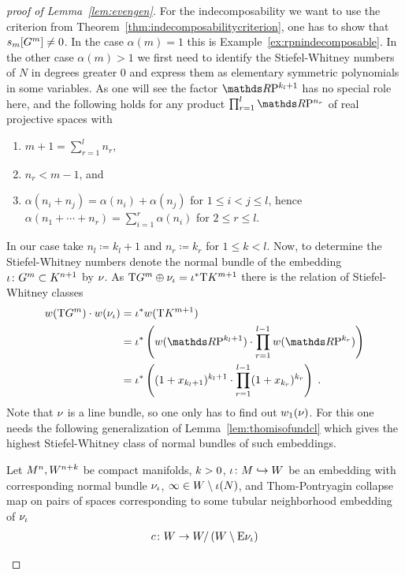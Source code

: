 \begin{proof}[proof of
  Lemma~\ref{lem:evengen}]
  For the indecomposability we want to use the criterion from
  Theorem~\ref{thm:indecomposabilitycriterion}, \idest one has to show
  that $s_{m}[G^{m}]\neq 0$.
  In the case $\alpha(m)=1$ this is Example~\ref{ex:rpnindecomposable}.
  In the other case $\alpha(m)>1$ we first need to identify the
  Stiefel-Whitney numbers of $N$ in degrees greater 0 and express them
  as elementary symmetric polynomials in some variables.
  As one will see the factor $\RP{k_l+1}$ has no special role here,
  and the following holds for any product $\prod_{r=1}^{l}\RP{n_r}$ of
  real projective spaces with
  \begin{enumerate}
  \item $m+1=\sum_{r=1}^l n_r$,
  \item $n_r<m-1$, and
  \item $\alpha(n_i+n_j)=\alpha(n_i)+\alpha(n_j)$
    for $1\leq i<j\leq l$,
    hence $\alpha(n_1+\dotsb+n_r)=\sum_{i=1}^{r}\alpha(n_i)$
    for $2\leq r\leq l$.
  \end{enumerate}
  In our case take $n_l\coloneqq k_l+1$ and 
  $n_r\coloneqq k_r$ for $1\leq k<l$.
  Now, to determine the Stiefel-Whitney numbers 
  denote the normal bundle of the embedding
  ${\iota}\colon G^{m}\subset K^{n+1}$ by $\nu_{}$. 
  As $\mathrm{T}G^{m}\oplus\nu_{{\iota}}={{\iota}}^*\mathrm{T}K^{m+1}$ there is the relation
  of Stiefel-Whitney classes
  \begin{align*}
    \W{\T{\G m}} \cdot \W{\N\emb}
    &= \pb\emb\W{\T{K^{m+1}}} \\
    &= \pb\emb\left(
      \W{\RP{k_l+1}}
      \cdot \prod_{r=1}^{l-1}\W{\RP{k_r}}
      \right) \\
    &= \pb\emb\left(
      (1+x_{k_l+1})^{k_l+1}
      \cdot \prod_{r=1}^{l-1}(1+x_{k_r})^{k_r}
      \right)
      \;.
  \end{align*}
  Note that $\nu_{}$ is a line bundle, so one only has to find out
  ${w_{1}}(\nu_{})$. For this one needs the following
  generalization of Lemma~\ref{lem:thomisofundcl} which gives the
  highest Stiefel-Whitney class of normal bundles of such embeddings.
  \begin{Lem}
    Let $M^n, W^{n+k}$ be compact manifolds, $k>0$,
    ${\iota}\colon M\hookrightarrow W$ be an embedding with corresponding normal
    bundle $\nu_{{\iota}}$, $\infty\in W\setminus{\iota}(N)$, and
    Thom-Pontryagin collapse map on pairs of spaces corresponding to
    some tubular neighborhood embedding of $\nu_{{\iota}}$
    \begin{gather*}
      \collapse\colon
      W
      \to W/\left( W\setminus \E{\N{\emb}} \right)

\end{gather*}
\end{Lem}
\end{proof}
